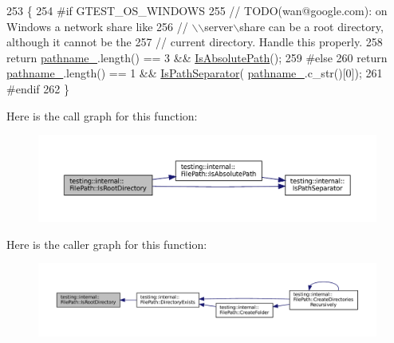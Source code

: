 \begin{DoxyCode}
253                                      \{
254 \textcolor{preprocessor}{#if GTEST\_OS\_WINDOWS}
255   \textcolor{comment}{// TODO(wan@google.com): on Windows a network share like}
256   \textcolor{comment}{// \(\backslash\)\(\backslash\)server\(\backslash\)share can be a root directory, although it cannot be the}
257   \textcolor{comment}{// current directory.  Handle this properly.}
258   \textcolor{keywordflow}{return} \hyperlink{classtesting_1_1internal_1_1FilePath_a12ce28a0015f85604e0372230fa18d6e}{pathname\_}.length() == 3 && \hyperlink{classtesting_1_1internal_1_1FilePath_ae17e5581e7996021e598851fe947df9c}{IsAbsolutePath}();
259 \textcolor{preprocessor}{#else}
260   \textcolor{keywordflow}{return} \hyperlink{classtesting_1_1internal_1_1FilePath_a12ce28a0015f85604e0372230fa18d6e}{pathname\_}.length() == 1 && \hyperlink{namespacetesting_1_1internal_a6b8d22cee9edbbfe56077420a6fa1cb1}{IsPathSeparator}(
      \hyperlink{classtesting_1_1internal_1_1FilePath_a12ce28a0015f85604e0372230fa18d6e}{pathname\_}.c\_str()[0]);
261 \textcolor{preprocessor}{#endif}
262 \}
\end{DoxyCode}
Here is the call graph for this function\+:
\nopagebreak
\begin{figure}[H]
\begin{center}
\leavevmode
\includegraphics[width=350pt]{classtesting_1_1internal_1_1FilePath_a0661adf59aec40c40c8e39b888d68142_cgraph}
\end{center}
\end{figure}
Here is the caller graph for this function\+:
\nopagebreak
\begin{figure}[H]
\begin{center}
\leavevmode
\includegraphics[width=350pt]{classtesting_1_1internal_1_1FilePath_a0661adf59aec40c40c8e39b888d68142_icgraph}
\end{center}
\end{figure}
\mbox{\label{classtesting_1_1internal_1_1FilePath_aa8c102da670261eb4fa8e2f2481df139}} 
